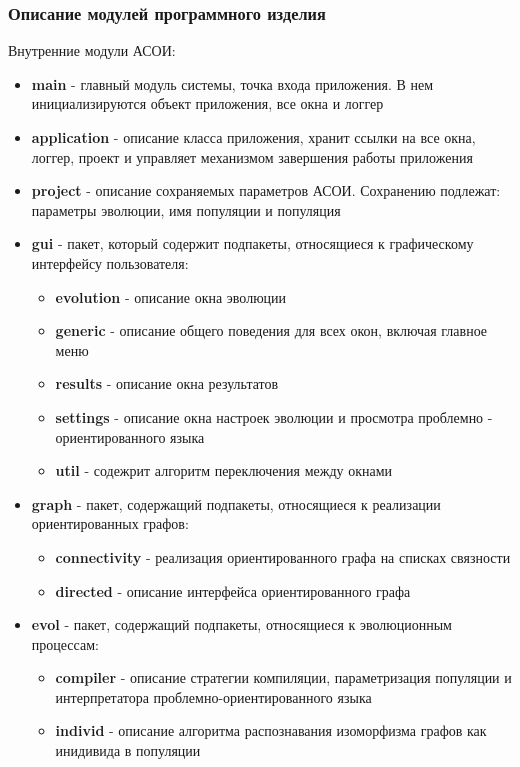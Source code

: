 \documentclass[russian,utf8,emptystyle]{eskdtext}
\begin{document}
\begin{spacing}{1.5}
\subsubsection{Описание модулей программного изделия}
Внутренние модули АСОИ:
\begin{itemize}
\item \textbf{main} - главный модуль системы, точка входа приложения. В нем инициализируются объект приложения, все окна и логгер
\item \textbf{application} - описание класса приложения, хранит ссылки на все окна, логгер, проект и управляет механизмом завершения работы приложения
\item \textbf{project} - описание сохраняемых параметров АСОИ. Сохранению подлежат: параметры эволюции, имя популяции и популяция
\item \textbf{gui} - пакет, который содержит подпакеты, относящиеся к графическому интерфейсу пользователя:
\begin{itemize}
\item \textbf{evolution} - описание окна эволюции
\item \textbf{generic} - описание общего поведения для всех окон, включая главное меню
\item \textbf{results} - описание окна результатов
\item \textbf{settings} - описание окна настроек эволюции и просмотра проблемно - ориентированного языка
\item \textbf{util} - содежрит алгоритм переключения между окнами
\end{itemize}
\item \textbf{graph} - пакет, содержащий подпакеты, относящиеся к реализации ориентированных графов:
\begin{itemize}
\item \textbf{connectivity} - реализация ориентированного графа на списках связности
\item \textbf{directed} - описание интерфейса ориентированного графа
\end{itemize}
\item \textbf{evol} - пакет, содержащий подпакеты, относящиеся к эволюционным процессам:
\begin{itemize}
\item \textbf{compiler} - описание стратегии компиляции, параметризация популяции и интерпретатора проблемно-ориентированного языка
\item \textbf{individ} - описание алгоритма распознавания изоморфизма графов как инидивида в популяции

\end{itemize}
\end{itemize}
\end{spacing}
\end{document}
